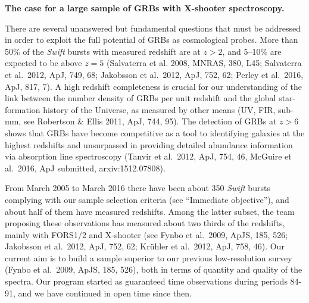 \documentclass[iop, twocolappendix, numberedappendix, tighten, appendixfloats]{emulateapj}
\begin{document}
	
	\smallskip
	\smallskip
	
	{\bf The case for a large sample of GRBs with X-shooter spectroscopy.}
	
	There are
	several unanswered but fundamental questions that must be addressed in order
	to exploit the full potential of GRBs as cosmological probes.
	More than 50\% of the \textit{Swift} bursts with measured redshift are at $z >
	2$, and  5--10\% are expected to be above $z=5$ (Salvaterra et al. 2008, MNRAS, 380, L45; Salvaterra et al.\ 2012, ApJ, 749,
	68; Jakobsson et al.\ 2012, ApJ, 752, 62; Perley et al.\ 2016, ApJ, 817, 7). 
	A high redshift completeness is
	crucial for our understanding of the link between the number density of GRBs
	per unit redshift and the global star-formation history of the Universe, as
	measured by other means (UV, FIR, sub-mm, see Robertson \& Ellis 2011, ApJ, 744,
	95). The detection of GRBs at $z > 6$ shows that GRBs have become competitive as
	a tool to identifying galaxies at the highest redshifts and unsurpassed in
	providing detailed abundance information via absorption line spectroscopy
	(Tanvir et al.\ 2012, ApJ, 754, 46, McGuire et al.\ 2016, ApJ submitted, 
	arxiv:1512.07808).
	
	\smallskip
	
	
	From March 2005 to March 2016 there have been about 350 {\it Swift} bursts 
	complying with
	our sample selection criteria (see ``Immediate objective''), and about half of them have
	measured redshifts. Among the latter subset, the team proposing these observations has
	measured about two thirds of the redshifts, mainly with FORS1/2 and X-shooter (see
	Fynbo et al.\ 2009, ApJS, 185, 526;  Jakobsson et al.\ 2012, ApJ, 752, 62;
	Kr\"uhler et al.\ 2012, ApJ, 758, 46). Our current aim is to build a sample superior to
	our previous low-resolution survey (Fynbo et al.\ 2009, ApJS, 185, 526), both in
	terms of quantity and  quality of the spectra. Our program started as 
	guaranteed time observations during
	periods 84-91, and we have continued in open time since then. 
	
\end{document}
